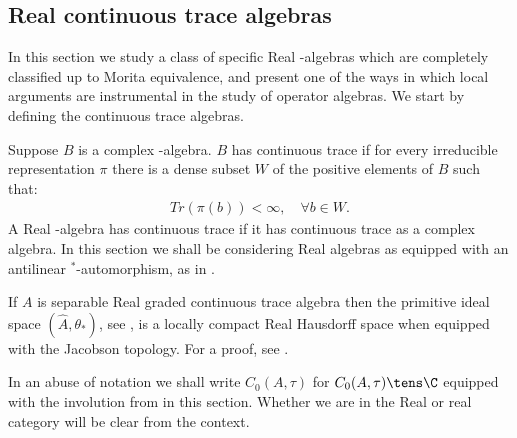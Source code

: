 \subsection{Real continuous trace algebras}
\begin{comment}
Add 8 different graded elementary algebras stemming from clifford classification!

Fiks local isomorphism i proposition 5.15 kopien! det er lokalt isomorft til C_0(Cliff_{0,n})!

CLIFFORD ALGEBRAER ER OGS{ ESSENTIELLE I CONTINUOUS TRACE!!!!
\end{comment}


In this section we study a class of specific Real \Cstar-algebras which are completely classified up to Morita equivalence, and present one of the ways in which local arguments are instrumental in the study of operator algebras. We start by defining the continuous trace algebras.
\begin{definition}
	Suppose $B$ is a complex \Cstar-algebra.
	$B$ has continuous trace if for every irreducible representation $\pi$ there is a dense subset $W$ of the positive elements of $B$ such that:
	\begin{align*} 
	Tr(\pi(b))<\infty, \quad \forall b \in W.
	\end{align*}
	A Real \Cstar-algebra has continuous trace if it has continuous trace as a complex \Cstar algebra. In this section we shall be considering Real \Cstar algebras as equipped with an antilinear $^*$-automorphism, as in . 
\end{definition}
\begin{remark}\label{separable}
	If $A$ is separable Real graded continuous trace algebra then the primitive ideal space $(\hat{A},\theta_*)$, see , is a locally compact Real Hausdorff space when equipped with the Jacobson topology. For a proof, see \cite[Chapter 5]{raeburncont}.
\end{remark}
\begin{remark}
	In an abuse of notation we shall write $C_0(A,\tau)$ for $C_0(A,\tau)\tens \C$ equipped with the involution from  in this section. Whether we are in the Real or real category will be clear from the context.
\end{remark}


